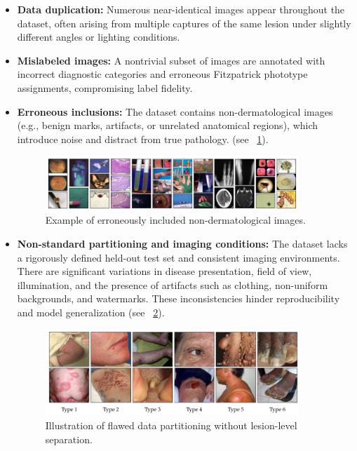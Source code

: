 \begin{itemize}
  \item \textbf{Data duplication:} Numerous near-identical images appear throughout the dataset, often arising from multiple captures of the same lesion under slightly different angles or lighting conditions.
  \item \textbf{Mislabeled images:} A nontrivial subset of images are annotated with incorrect diagnostic categories and erroneous Fitzpatrick phototype assignments, compromising label fidelity.
  \item \textbf{Erroneous inclusions:} The dataset contains non-dermatological images (e.g., benign marks, artifacts, or unrelated anatomical regions), which introduce noise and distract from true pathology. (see \figurename~\ref{fig:fitz_erroneous}).
    \begin{figure}[h!]
      \centering
      \includegraphics[width=0.9\textwidth]{images/fitz_erroneous.png}
      \caption{Example of erroneously included non-dermatological images.}
      \label{fig:fitz_erroneous}
    \end{figure}
  \item \textbf{Non-standard partitioning and imaging conditions:} The dataset lacks a rigorously defined held-out test set and consistent imaging environments. There are significant variations in disease presentation, field of view, illumination, and the presence of artifacts such as clothing, non-uniform backgrounds, and watermarks. These inconsistencies hinder reproducibility and model generalization (see \figurename~\ref{fig:non_standard_splits}).
    \begin{figure}[h!]
      \centering
      \includegraphics[width=0.9\textwidth]{images/fitz_partitioning.png}
      \caption{Illustration of flawed data partitioning without lesion-level separation.}
      \label{fig:non_standard_splits}
    \end{figure}
\end{itemize}

